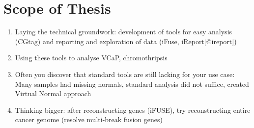 \chapter*{Scope of Thesis}

\begin{enumerate}
    \item Laying the technical groundwork: development of tools for easy analysis (CGtag) and reporting and exploration of data (iFuse, iReport[@ireport])
    \item Using these tools to analyse VCaP, chromothripsis
    \item Often you discover that standard tools are still lacking for your use case: Many samples had missing normals, standard analysis did not suffice, created Virtual Normal approach
    \item Thinking bigger: after reconstructing genes (iFUSE), try reconstructing entire cancer genome (resolve multi-break fusion genes)
\end{enumerate}
